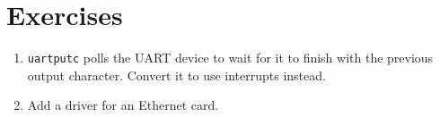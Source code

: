 \section{Exercises}

\begin{enumerate}

\item \texttt{uartputc}  polls the
  UART device to wait for it to finish with the previous output
  character. Convert it to use interrupts instead.
  
\item Add a driver for an Ethernet card.

\end{enumerate}
